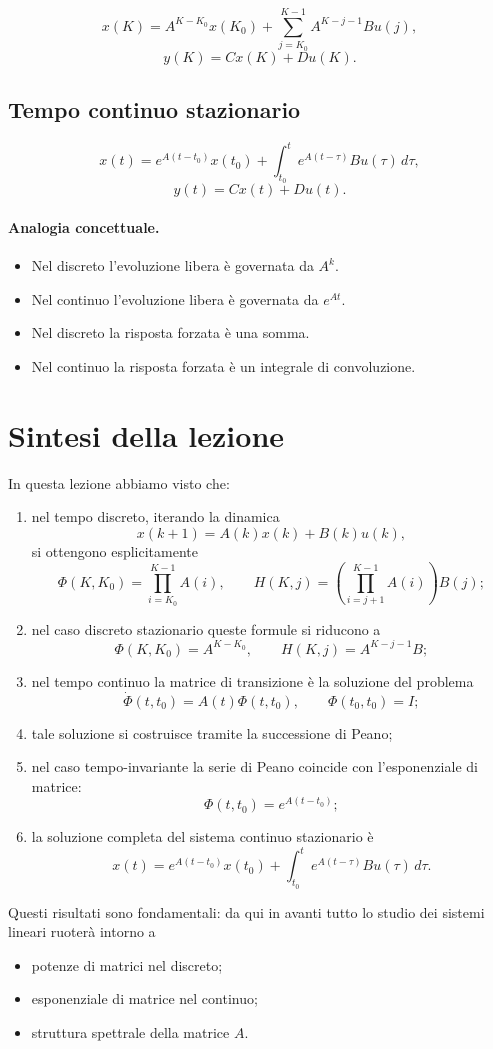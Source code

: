 \[
x(K)=A^{K-K_0}x(K_0)+\sum_{j=K_0}^{K-1}A^{K-j-1}Bu(j),
\]
\[
y(K)=Cx(K)+Du(K).
\]

\subsection{Tempo continuo stazionario}

\[
x(t)=e^{A(t-t_0)}x(t_0)+\int_{t_0}^{t}e^{A(t-\tau)}Bu(\tau)\,d\tau,
\]
\[
y(t)=Cx(t)+Du(t).
\]

\paragraph{Analogia concettuale.}
\begin{itemize}
    \item Nel discreto l'evoluzione libera è governata da $A^k$.
    \item Nel continuo l'evoluzione libera è governata da $e^{At}$.
    \item Nel discreto la risposta forzata è una somma.
    \item Nel continuo la risposta forzata è un integrale di convoluzione.
\end{itemize}

\section{Sintesi della lezione}

In questa lezione abbiamo visto che:

\begin{enumerate}
    \item nel tempo discreto, iterando la dinamica
    \[
    x(k+1)=A(k)x(k)+B(k)u(k),
    \]
    si ottengono esplicitamente
    \[
    \Phi(K,K_0)=\prod_{i=K_0}^{K-1}A(i),
    \qquad
    H(K,j)=\left(\prod_{i=j+1}^{K-1}A(i)\right)B(j);
    \]

    \item nel caso discreto stazionario queste formule si riducono a
    \[
    \Phi(K,K_0)=A^{K-K_0},
    \qquad
    H(K,j)=A^{K-j-1}B;
    \]

    \item nel tempo continuo la matrice di transizione è la soluzione del problema
    \[
    \dot \Phi(t,t_0)=A(t)\Phi(t,t_0),
    \qquad
    \Phi(t_0,t_0)=I;
    \]

    \item tale soluzione si costruisce tramite la successione di Peano;

    \item nel caso tempo-invariante la serie di Peano coincide con l'esponenziale di matrice:
    \[
    \Phi(t,t_0)=e^{A(t-t_0)};
    \]

    \item la soluzione completa del sistema continuo stazionario è
    \[
    x(t)=e^{A(t-t_0)}x(t_0)+\int_{t_0}^{t}e^{A(t-\tau)}Bu(\tau)\,d\tau.
    \]
\end{enumerate}

Questi risultati sono fondamentali: da qui in avanti tutto lo studio dei sistemi lineari ruoterà intorno a
\begin{itemize}
    \item potenze di matrici nel discreto;
    \item esponenziale di matrice nel continuo;
    \item struttura spettrale della matrice $A$.
\end{itemize}